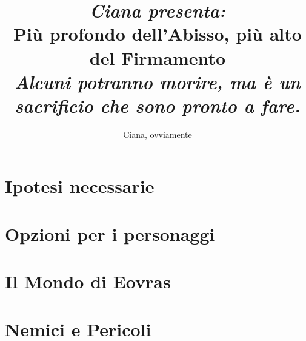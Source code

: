 \documentclass[letterpaper,twocolumn,openany,nodeprecatedcode]{dndbook}
\title{\large{\textit{Ciana presenta:}}\\
    Più profondo dell'Abisso, più alto del Firmamento \\
    \large {\textit{Alcuni potranno morire, ma è un sacrificio che sono pronto a fare.}}
    }
\author{Ciana, ovviamente}
\date{}
\begin{document}
\frontmatter

\maketitle

\tableofcontents

\mainmatter

\part{Ipotesi necessarie}





\part{Opzioni per i personaggi}

%































%

\part{Il Mondo di Eovras}







\part{Nemici e Pericoli}
\end{document}
